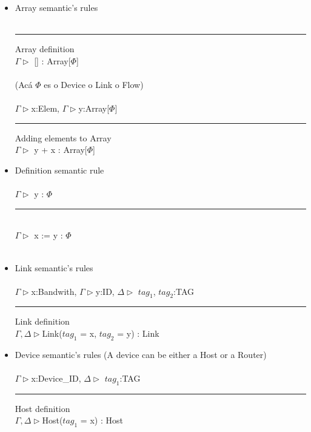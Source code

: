 \documentclass[envcountsect,runningheads]{llncs}
\begin{document}
\begin{itemize}
	\item Array semantic's rules \\
	\\
	\noindent\rule{7cm}{0.4pt} Array definition\\
	$\Gamma\rhd$ [] : Array[$\Phi$]\\
	\\
	(Ac\'a $\Phi$ es o Device o Link o Flow) \\
	\\
	$\Gamma \rhd$x:Elem, $\Gamma \rhd$y:Array[$\Phi$] \\
	\noindent\rule{7cm}{0.4pt}  Adding elements to Array\\
	$\Gamma \rhd$ y + x : Array[$\Phi$]\\	
	
	\item Definition semantic rule \\	
	\\ 
	$\Gamma \rhd $ y : $\Phi$ \\
	\noindent\rule{7cm}{0.4pt} \\
	$\Gamma \rhd$ x := y : $\Phi$\\
	\\
	
	\item Link semantic's rules \\
	\\
	$\Gamma \rhd$x:Bandwith, $\Gamma \rhd$y:ID, $\Delta \rhd$ $tag_{1}$, $tag_{2}$:TAG \\
	\noindent\rule{7cm}{0.4pt} Link definition\\
	$\Gamma, \Delta \rhd$Link($tag_{1}$ = x, $tag_{2}$ = y) : Link\\
	
	\item Device semantic's rules (A device can be either a Host or a Router) \\
	\\
	$\Gamma \rhd$x:Device\_ID, $\Delta \rhd$ $tag_{1}$:TAG \\
	\noindent\rule{7cm}{0.4pt} Host definition\\
	$\Gamma, \Delta \rhd$Host($tag_{1}$ = x) : Host\\	
	

\end{itemize}
\end{document}

